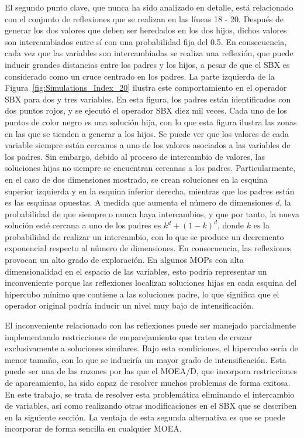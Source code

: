 El segundo punto clave, que nunca ha sido analizado en detalle, está relacionado con el conjunto de reflexiones que se 
realizan en las líneas 18 - 20.
%
Después de generar los dos valores que deben ser heredados en los dos hijos, dichos valores son intercambiados entre sí 
con una probabilidad fija del 0.5.
%
En consecuencia, cada vez que las variables son intercambiadas se realiza una reflexión, que puede inducir grandes distancias 
entre los padres y los hijos, a pesar de que el SBX es considerado como un cruce centrado en los padres.
%
La parte izquierda de la Figura~\ref{fig:Simulations_Index_20} ilustra este comportamiento en el operador SBX para dos y tres variables.
%
En esta figura, los padres están identificados con dos puntos rojos, y se ejecutó el operador SBX diez mil veces.
%
Cada uno de los puntos de color negro es una solución hija, con lo que esta figura ilustra las zonas en las que se tienden 
a generar a los hijos.
%
Se puede ver que los valores de cada variable siempre están cercanos a uno de los valores asociados a las variables de los padres. 
%
Sin embargo, debido al proceso de intercambio de valores, las soluciones hijas no siempre se encuentran cercanas a los padres.
%
Particularmente, en el caso de dos dimensiones mostrado, se crean soluciones en la esquina superior izquierda y en la esquina inferior derecha, mientras que los padres están es las esquinas opuestas.
%
A medida que aumenta el número de dimensiones $d$, la probabilidad de que siempre o nunca haya intercambios, y que por tanto, 
la nueva solución esté cercana a uno de los padres es $k^{d} + (1-k)^{d}$, donde $k$ es la probabilidad de realizar un intercambio,
con lo que se produce un decremento exponencial respecto al número de dimensiones.
%
En consecuencia, las reflexiones provocan un alto grado de exploración.
%
En algunos MOPs con alta dimensionalidad en el espacio de las variables, esto podría representar un inconveniente porque las reflexiones localizan soluciones hijas en cada esquina del hipercubo mínimo que contiene a las soluciones padre, lo que significa que el operador original podría inducir un nivel muy bajo de intensificación.

El inconveniente relacionado con las reflexiones puede ser manejado parcialmente implementando restricciones de emparejamiento que traten de cruzar exclusivamente a soluciones similares. 
%
Bajo esta condiciones, el hipercubo sería de menor tamaño, con lo que se induciría un mayor grado de intensificación.
%
Esta puede ser una de las razones por las que el MOEA/D, que incorpora restricciones de apareamiento, ha sido capaz de resolver muchos problemas de forma exitosa.
%
En este trabajo, se trata de resolver esta problemática eliminando el intercambio de variables, 
así como realizando otras modificaciones en el SBX que se describen en la siguiente sección.
%
La ventaja de esta segunda alternativa es que se puede incorporar de forma sencilla en cualquier MOEA.
%

